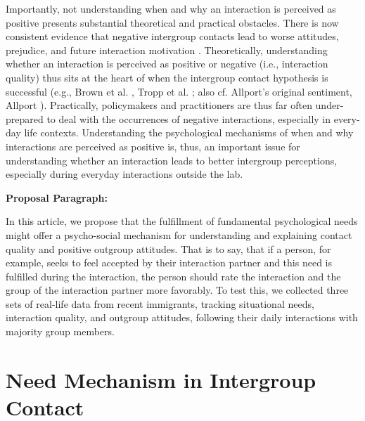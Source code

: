 \documentclass[man, 12pt, a4paper]{apa7}
\theoremstyle{break}
\theoremstyle{plain}
\begin{document}
Importantly, not understanding when and why an interaction is perceived as positive presents substantial theoretical and practical obstacles. There is now consistent evidence that negative intergroup contacts lead to worse attitudes, prejudice, and future interaction motivation \citep[e.g.,][]{Barlow2012, Prati2021, Graf2014}. Theoretically, understanding whether an interaction is perceived as positive or negative (i.e., interaction quality) thus sits at the heart of when the intergroup contact hypothesis is successful (e.g., Brown et al. \citeyear{Brown2007}, Tropp et al. \citeyear{Tropp2016}; also cf. Allport’s original sentiment, Allport \citeyear{Allport1954b}). Practically, policymakers and practitioners are thus far often under-prepared to deal with the occurrences of negative interactions, especially in every-day life contexts. Understanding the psychological mechanisms of when and why interactions are perceived as positive is, thus, an important issue for understanding whether an interaction leads to better intergroup perceptions, especially during everyday interactions outside the lab.

\textbf{Proposal Paragraph:}

In this article, we propose that the fulfillment of fundamental psychological needs might offer a psycho-social mechanism for understanding and explaining contact quality and positive outgroup attitudes. That is to say, that if a person, for example, seeks to feel accepted by their interaction partner and this need is fulfilled during the interaction, the person should rate the interaction and the group of the interaction partner more favorably. To test this, we collected three sets of real-life data from recent immigrants, tracking situational needs, interaction quality, and outgroup attitudes, following their daily interactions with majority group members. 

\section{Need Mechanism in Intergroup Contact}
\end{document}
